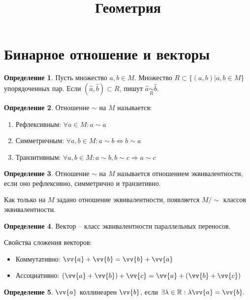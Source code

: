 \documentclass[12pt]{article}
\title{\textbf{Геометрия}}\date{}\author{}
\theoremstyle{definition}
\newtheorem{definition}{Определение}
\newcommand{\R}{\mathbb{R}}
\begin{document}
\maketitle
\tableofcontents
\label{toc}
\newpage

\section{Бинарное отношение и векторы}

\begin{definition}
     Пусть множество $a,b \in M$. Множество $R \subset \{(a,b)|a,b\in M\}$ упорядоченных пар. Если $(\widehat{a},\widehat{b})\subset R$, пишут $\widehat{a}\underset{R}{\sim}\widehat{b}.$
\end{definition}

\begin{definition}
    Отношение $\sim$ на $M$ называется:
        \begin{enumerate}
            \item Рефлексивным: $\forall a \in M: a\sim a$
            \item Симметричным: $\forall a,b \in M: a\sim b \Longleftrightarrow b\sim a$
            \item Транзитивным: $\forall a,b \in M: a\sim b, b\sim c \Longrightarrow a \sim c$
        \end{enumerate}
\end{definition}
    
    \begin{definition}
        Отношение $\sim$ на $M$ называется отношением эквивалентности, если оно рефлексивно, симметрично и транзитивно.
    \end{definition}

    Как только на $M$ задано отношение эквивалентности, появляется $M/\sim$ классов эквивалентности.

\begin{definition}
    Вектор -- класс эквивалентности параллельных переносов.
\end{definition}

    Свойства сложения векторов:
    \begin{itemize}
        \item Коммутативно: $\vv{a}+\vv{b}=\vv{b}+\vv{a}$
        \item Ассоциативно: $(\vv{a}+\vv{b})+\vv{c}=\vv{a}+(\vv{b}+\vv{c})$
    \end{itemize}

    \begin{definition}
        $\vv{a}$ коллинеарен $\vv{b}$, если $\exists \lambda \in \R: \lambda\vv{a}=\vv{b}.$
    \end{definition}
\end{document}
